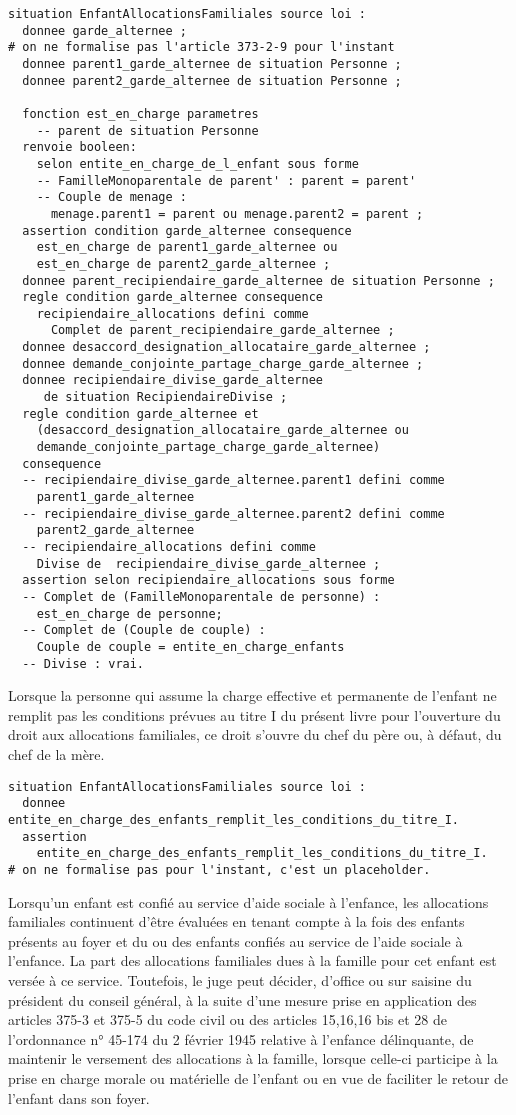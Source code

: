 \documentclass[11pt, french]{article}
\begin{document}
\begin{lstlisting}
situation EnfantAllocationsFamiliales source loi :
  donnee garde_alternee ;
# on ne formalise pas l'article 373-2-9 pour l'instant
  donnee parent1_garde_alternee de situation Personne ;
  donnee parent2_garde_alternee de situation Personne ;

  fonction est_en_charge parametres
    -- parent de situation Personne
  renvoie booleen:
    selon entite_en_charge_de_l_enfant sous forme
    -- FamilleMonoparentale de parent' : parent = parent'
    -- Couple de menage :
      menage.parent1 = parent ou menage.parent2 = parent ;
  assertion condition garde_alternee consequence
    est_en_charge de parent1_garde_alternee ou
    est_en_charge de parent2_garde_alternee ;
  donnee parent_recipiendaire_garde_alternee de situation Personne ;
  regle condition garde_alternee consequence
    recipiendaire_allocations defini comme
      Complet de parent_recipiendaire_garde_alternee ;
  donnee desaccord_designation_allocataire_garde_alternee ;
  donnee demande_conjointe_partage_charge_garde_alternee ;
  donnee recipiendaire_divise_garde_alternee
     de situation RecipiendaireDivise ;
  regle condition garde_alternee et
    (desaccord_designation_allocataire_garde_alternee ou
    demande_conjointe_partage_charge_garde_alternee)
  consequence
  -- recipiendaire_divise_garde_alternee.parent1 defini comme
    parent1_garde_alternee
  -- recipiendaire_divise_garde_alternee.parent2 defini comme
    parent2_garde_alternee
  -- recipiendaire_allocations defini comme
    Divise de  recipiendaire_divise_garde_alternee ;
  assertion selon recipiendaire_allocations sous forme
  -- Complet de (FamilleMonoparentale de personne) :
    est_en_charge de personne;
  -- Complet de (Couple de couple) :
    Couple de couple = entite_en_charge_enfants
  -- Divise : vrai.
\end{lstlisting}
Lorsque la personne qui assume la charge effective et permanente de l'enfant ne remplit pas les conditions prévues au titre I du présent livre pour l'ouverture du droit aux allocations familiales, ce droit s'ouvre du chef du père ou, à défaut, du chef de la mère.
\begin{lstlisting}
situation EnfantAllocationsFamiliales source loi :
  donnee entite_en_charge_des_enfants_remplit_les_conditions_du_titre_I.
  assertion
    entite_en_charge_des_enfants_remplit_les_conditions_du_titre_I.
# on ne formalise pas pour l'instant, c'est un placeholder.
\end{lstlisting}
Lorsqu'un enfant est confié au service d'aide sociale à l'enfance, les allocations familiales continuent d'être évaluées en tenant compte à la fois des enfants présents au foyer et du ou des enfants confiés au service de l'aide sociale à l'enfance. La part des allocations familiales dues à la famille pour cet enfant est versée à ce service. Toutefois, le juge peut décider, d'office ou sur saisine du président du conseil général, à la suite d'une mesure prise en application des articles 375-3 et 375-5 du code civil ou des articles 15,16,16 bis et 28 de l'ordonnance n° 45-174 du 2 février 1945 relative à l'enfance délinquante, de maintenir le versement des allocations à la famille, lorsque celle-ci participe à la prise en charge morale ou matérielle de l'enfant ou en vue de faciliter le retour de l'enfant dans son foyer.
\end{document}
